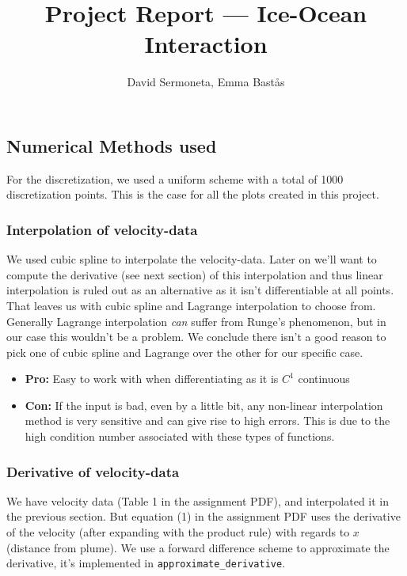 \documentclass{article}
\title{Project Report — Ice-Ocean Interaction}
\author{David Sermoneta, Emma Bastås}
\begin{document}
\maketitle

\subsection*{Numerical Methods used}

\noindent For the discretization, we used a uniform scheme with a total of 1000 discretization points. This is the case for all the plots created in this project.

\subsubsection*{Interpolation of velocity-data}

We used cubic spline to interpolate the velocity-data. Later on we'll want to compute the derivative (see next section) of this interpolation and thus linear interpolation is ruled out as an alternative as it isn't differentiable at all points. That leaves us with cubic spline and Lagrange interpolation to choose from. Generally Lagrange interpolation \emph{can} suffer from Runge's phenomenon, but in our case this wouldn't be a problem. We conclude there isn't a good reason to pick one of cubic spline and Lagrange over the other for our specific case.

\begin{itemize}
    \item[] \textbf{Pro:} Easy to work with when differentiating as it is $C^1$ continuous
    \item[] \textbf{Con:} If the input is bad, even by a little bit, any non-linear interpolation method is very sensitive and can give rise to high errors. This is due to the high condition number associated with these types of functions.
\end{itemize}

\subsubsection*{Derivative of velocity-data}
We have velocity data (Table 1 in the assignment PDF), and interpolated it in the previous section. But equation (1) in the assignment PDF uses the derivative of the velocity (after expanding with the product rule) with regards to $x$ (distance from plume). We use a forward difference scheme to approximate the derivative, it's implemented in \texttt{approximate\_derivative}.
\end{document}
